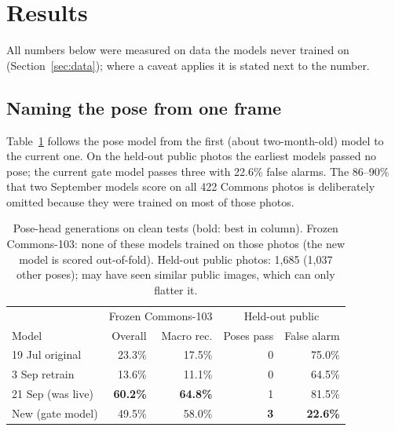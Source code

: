 \section{Results}\label{sec:results}
All numbers below were measured on data the models never trained on (Section~\ref{sec:data}); where a caveat applies it is stated next to the number.

\subsection{Naming the pose from one frame}
 Table~\ref{tab:posehead} follows the pose model from the first (about two-month-old) model to the current one. On the held-out public photos the earliest models passed no pose; the current gate model passes three with 22.6\% false alarms. The 86--90\% that two September models score on all 422 Commons photos is deliberately omitted because they were trained on most of those photos.
\begin{table}[t]
\centering\footnotesize
\caption{Pose-head generations on clean tests (bold: best in column). Frozen Commons-103: none of these models trained on those photos (the new model is scored out-of-fold). Held-out public photos: 1{,}685 (1{,}037 other poses); \vfour{} may have seen similar public images, which can only flatter it.}\label{tab:posehead}
\begin{tabular}{@{}lrrrr@{}}
\toprule
 & \multicolumn{2}{c}{Frozen Commons-103} & \multicolumn{2}{c}{Held-out public} \\
Model & Overall & Macro rec. & Poses pass & False alarm \\ \midrule
19 Jul original & 23.3\% & 17.5\% & 0 & 75.0\% \\
3 Sep retrain & 13.6\% & 11.1\% & 0 & 64.5\% \\
21 Sep \vfour{} (was live) & \textbf{60.2\%} & \textbf{64.8\%} & 1 & 81.5\% \\
New (gate model) & 49.5\% & 58.0\% & \textbf{3} & \textbf{22.6\%} \\ \bottomrule
\end{tabular}
\end{table}

